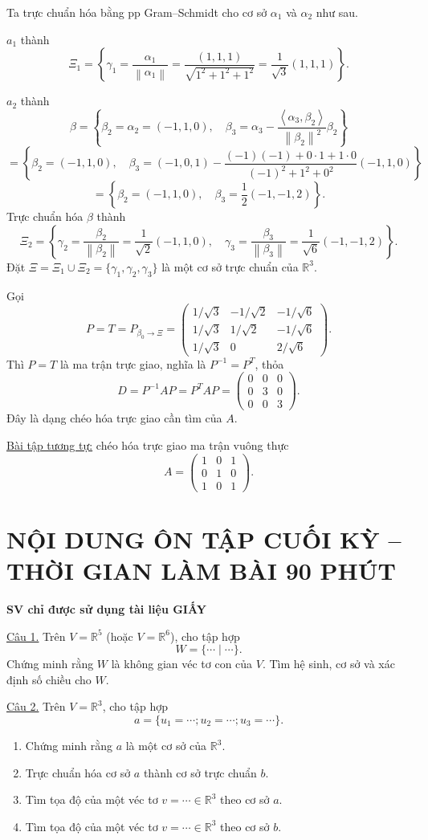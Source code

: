 \documentclass[12pt,a4paper]{article}
\newcommand{\R}{\mathbb{R}}
\newcommand{\ip}[2]{\left\langle #1,#2\right\rangle}
\newcommand{\norm}[1]{\left\lVert #1\right\rVert}
\begin{document}
Ta trực chuẩn hóa bằng pp Gram--Schmidt cho cơ sở $\alpha_1$ và $\alpha_2$ như sau.

$a_1$ thành
\[
\Xi_1=\left\{\gamma_1=\frac{\alpha_1}{\norm{\alpha_1}}=\frac{(1,1,1)}{\sqrt{1^2+1^2+1^2}}=\frac1{\sqrt3}(1,1,1)\right\}.
\]

$a_2$ thành
\[
\beta=\left\{\beta_2=\alpha_2=(-1,1,0),\quad
\beta_3=\alpha_3-\frac{\ip{\alpha_3}{\beta_2}}{\norm{\beta_2}^2}\beta_2\right\}
\]
\[
=\left\{\beta_2=(-1,1,0),\quad
\beta_3=(-1,0,1)-\frac{(-1)(-1)+0\cdot1+1\cdot0}{(-1)^2+1^2+0^2}(-1,1,0)\right\}
\]
\[
=\left\{\beta_2=(-1,1,0),\quad\beta_3=\frac12(-1,-1,2)\right\}.
\]
Trực chuẩn hóa $\beta$ thành
\[
\Xi_2=\left\{\gamma_2=\frac{\beta_2}{\norm{\beta_2}}=\frac1{\sqrt2}(-1,1,0),\quad
\gamma_3=\frac{\beta_3}{\norm{\beta_3}}=\frac1{\sqrt6}(-1,-1,2)\right\}.
\]
Đặt $\Xi=\Xi_1\cup\Xi_2=\{\gamma_1,\gamma_2,\gamma_3\}$ là một cơ sở trực chuẩn của $\R^3$.

Gọi
\[
P=T=P_{\beta_0\to\Xi}=
\begin{pmatrix}
1/\sqrt3&-1/\sqrt2&-1/\sqrt6\\
1/\sqrt3&1/\sqrt2&-1/\sqrt6\\
1/\sqrt3&0&2/\sqrt6
\end{pmatrix}.
\]
Thì $P=T$ là ma trận trực giao, nghĩa là $P^{-1}=P^T$, thỏa
\[
D=P^{-1}AP=P^TAP=
\begin{pmatrix}0&0&0\\0&3&0\\0&0&3\end{pmatrix}.
\]
Đây là dạng chéo hóa trực giao cần tìm của $A$.

\underline{Bài tập tương tự:} chéo hóa trực giao ma trận vuông thực
\[
A=\begin{pmatrix}1&0&1\\0&1&0\\1&0&1\end{pmatrix}.
\]

\section*{NỘI DUNG ÔN TẬP CUỐI KỲ -- THỜI GIAN LÀM BÀI 90 PHÚT}
\textbf{SV chỉ được sử dụng tài liệu GIẤY}

\underline{Câu 1.} Trên $V=\R^5$ (hoặc $V=\R^6$), cho tập hợp
\[
W=\{\cdots\mid\cdots\}.
\]
Chứng minh rằng $W$ là không gian véc tơ con của $V$. Tìm hệ sinh, cơ sở và xác định số chiều cho $W$.

\underline{Câu 2.} Trên $V=\R^3$, cho tập hợp
\[
a=\{u_1=\cdots;u_2=\cdots;u_3=\cdots\}.
\]
\begin{enumerate}[label=\alph*/]
\item Chứng minh rằng $a$ là một cơ sở của $\R^3$.
\item Trực chuẩn hóa cơ sở $a$ thành cơ sở trực chuẩn $b$.
\item Tìm tọa độ của một véc tơ $v=\cdots\in\R^3$ theo cơ sở $a$.
\item Tìm tọa độ của một véc tơ $v=\cdots\in\R^3$ theo cơ sở $b$.
\end{enumerate}
\end{document}
